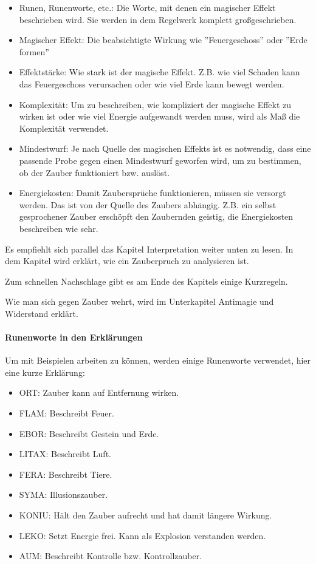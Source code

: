 \documentclass{article}
\begin{document}
\begin{itemize}
\item Runen, Runenworte, etc.: Die Worte, mit denen ein magischer Effekt beschrieben wird. Sie werden in dem Regelwerk komplett großgeschrieben.
\item Magischer Effekt: Die beabsichtigte Wirkung wie ''Feuergeschoss'' oder ''Erde formen''
\item Effektstärke: Wie stark ist der magische Effekt. Z.B. wie viel Schaden kann das Feuergeschoss verursachen oder wie viel Erde kann bewegt werden.
\item Komplexität: Um zu beschreiben, wie kompliziert der magische Effekt zu wirken ist oder wie viel Energie aufgewandt werden muss, wird als Maß die Komplexität verwendet.
\item Mindestwurf: Je nach Quelle des magischen Effekts ist es notwendig, dass eine passende Probe gegen einen Mindestwurf geworfen wird, um zu bestimmen, ob der Zauber funktioniert bzw. auslöst.
\item Energiekosten: Damit Zaubersprüche funktionieren, müssen sie versorgt werden. Das ist von der Quelle des Zaubers abhängig. Z.B. ein selbst gesprochener Zauber erschöpft den Zaubernden geistig, die Energiekosten beschreiben wie sehr.
\end{itemize}

Es empfiehlt sich parallel das Kapitel Interpretation weiter unten zu lesen. In dem Kapitel wird erklärt, wie ein Zauberpruch
zu analysieren ist.

Zum schnellen Nachschlage gibt es am Ende des Kapitels einige Kurzregeln.

Wie man sich gegen Zauber wehrt, wird im Unterkapitel Antimagie und Widerstand erklärt.

\paragraph{Runenworte in den Erklärungen}

Um mit Beispielen arbeiten zu können, werden einige Runenworte verwendet, hier eine kurze Erklärung:

\begin{itemize}
\item ORT: Zauber kann auf Entfernung wirken.
\item FLAM: Beschreibt Feuer.
\item EBOR: Beschreibt Gestein und Erde.
\item LITAX: Beschreibt Luft.
\item FERA: Beschreibt Tiere.
\item SYMA: Illusionszauber.
\item KONIU: Hält den Zauber aufrecht und hat damit längere Wirkung.
\item LEKO: Setzt Energie frei. Kann als Explosion verstanden werden.
\item AUM: Beschreibt Kontrolle bzw. Kontrollzauber.
\end{itemize}
\end{document}
